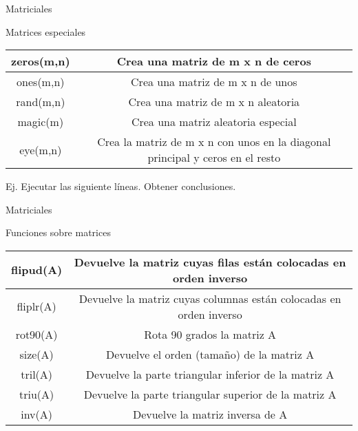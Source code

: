 \documentclass{bredelebeamer}
\begin{document}
\begin{frame}{Matriciales}
\begin{center}
Matrices especiales
\end{center}
\begin{table}[]
\centering
\begin{tabular}{|c|c|}
\hline
zeros(m,n) & Crea una matriz de m x n de ceros                                             \\ \hline
ones(m,n)  & Crea una matriz de m x n de unos                                              \\ \hline
rand(m,n)  & Crea una matriz de m x n aleatoria                                            \\ \hline
magic(m)   & Crea una matriz aleatoria especial                                            \\ \hline
eye(m,n)   & Crea la matriz de m x n con unos en la diagonal principal y ceros en el resto \\ \hline
\end{tabular}
\end{table}
Ej. Ejecutar las siguiente líneas. Obtener conclusiones.
\end{frame}

\begin{frame}{Matriciales}
\begin{center}
Funciones sobre matrices
\end{center}
\begin{table}[]
\centering
\begin{tabular}{|c|c|}
\hline
flipud(A) & Devuelve la matriz cuyas filas están colocadas en orden inverso    \\ \hline
fliplr(A) & Devuelve la matriz cuyas columnas están colocadas en orden inverso \\ \hline
rot90(A)  & Rota 90 grados la matriz A                                          \\ \hline
size(A)   & Devuelve el orden (tamaño) de la matriz A                          \\ \hline
tril(A)   & Devuelve la parte triangular inferior de la matriz A                \\ \hline
triu(A)   & Devuelve la parte triangular superior de la matriz A                \\ \hline
inv(A)    & Devuelve la matriz inversa de A                                     \\ \hline
\end{tabular}
\end{table}
\end{frame}
\end{document}
